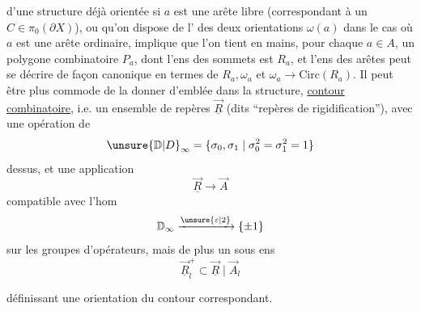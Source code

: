 
d'une structure déjà orientée si $a$ est une arête libre (correspondant à un $C\in\pi_0(\partial X)$), ou qu'on dispose de l' des deux orientations $\omega(a)$ \deleted{\unsure{=}} dans le cas où $a$ est une arête ordinaire, implique que l'on tient en mains, pour chaque $a\in A$, un polygone combinatoire $P_a$, dont l'ens des sommets est $R_a$, et l'ens des arêtes peut se décrire  de façon canonique en termes de $R_a,\omega_a$ et $\omega_a\to\mathrm{Circ}(R_a)$. Il peut être plus commode de la donner d'emblée dans la structure,   \uline{contour combinatoire}, i.e. un ensemble de repères $\underline{\vec R}$ (dits ``repères de rigidification''), avec une opération de
\[
 {\unsure{\mathbb D|D}}_{\infty}=\{\sigma_0,\sigma_1\mid\sigma_0^2=\sigma_1^2=1\}
\]
dessus, et une application
\[
 \underline{\vec R}\longrightarrow\vec A
\]
compatible avec l'hom
\[
 \mathbb D_{\infty}\xrightarrow{\unsure{\varepsilon|2}}\{\pm1\}
\]
sur les groupes d'opérateurs, mais de plus un sous ens
\[
 \underline{\vec R}_{l}^{+}\subset\underline{\vec R}\mid\vec A_l
\]


définissant une orientation du contour correspondant.

